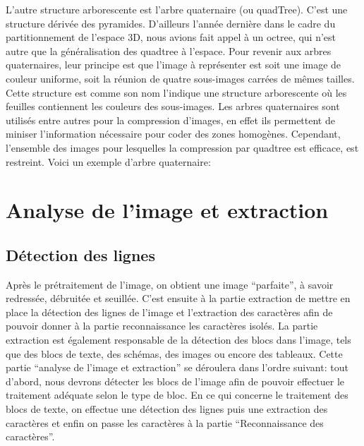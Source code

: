 \documentclass[]{report}
\begin{document}
      L'autre structure arborescente est l'arbre quaternaire (ou quadTree). C'est une structure dérivée des pyramides. D'ailleurs l'année dernière dans le cadre du partitionnement de l'espace 3D, nous avions fait appel à un octree, qui n'est autre que la généralisation des quadtree à l'espace. Pour revenir aux arbres quaternaires, leur principe est que l'image à représenter est soit une image de couleur uniforme, soit la réunion de quatre sous-images carrées de mêmes tailles. Cette structure est comme son nom l'indique une structure arborescente où les feuilles contiennent les couleurs des sous-images. Les arbres quaternaires sont utilisés entre autres pour la compression d'images, en effet ils permettent de miniser l'information nécessaire pour coder des zones homogènes. Cependant, l'ensemble des images pour lesquelles la compression par quadtree est efficace, est restreint. Voici un exemple d'arbre quaternaire:
      





	\chapter{Analyse de l'image et extraction} %
	\label{cha:analyse_de_l'image_et_extraction}

    \section{D\'etection des lignes} %
    \label{sec:d'etection_des_lignes}

      Après le prétraitement de l'image, on obtient une image ``parfaite'', à savoir redressée, débruitée et seuillée. C'est ensuite à la partie extraction de mettre en place la détection des lignes de l'image et l'extraction des caractères afin de pouvoir donner à la partie reconnaissance les caractères isolés. La partie extraction est également responsable de la détection des blocs dans l'image, tels que des blocs de texte, des schémas, des images ou encore des tableaux.
      Cette partie ``analyse de l'image et extraction'' se déroulera dans l'ordre suivant: tout d'abord, nous devrons détecter les blocs de l'image afin de pouvoir effectuer le traitement adéquate selon le type de bloc. En ce qui concerne le traitement des blocs de texte, on effectue une détection des lignes puis une extraction des caractères et enfin on passe les caractères à la partie ``Reconnaissance des caractères''.
\end{document}
